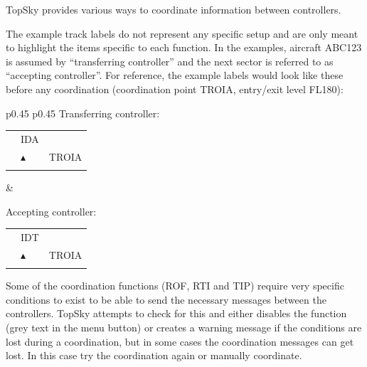 \documentclass[a4paper,oneside,11pt]{memoir}
\begin{document}
TopSky provides various ways to coordinate information between controllers.

\bigskip

The example track labels do not represent any specific setup and are only meant to highlight the items specific to each function. In the examples, aircraft ABC123 is assumed by “transferring controller” and the next sector is referred to as “accepting controller”. For reference, the example labels would look like these before any coordination (coordination point TROIA, entry/exit level FL180):

\bigskip

\begin{longtable}{p{} p{}}
  Transferring controller:

  \begin{tabular}{
    >{\columncolor{Flight Highlight}}l 
    >{\columncolor{Flight Highlight}}l
    >{\columncolor{Flight Highlight}}l }
    {\color{Assumed} ABC123} & {\color{Coordination} IDA}       & {\color{Assumed} }      \\
    {\color{Assumed} 100}    & {\color{Assumed} $\blacktriangle$} & {\color{Assumed} TROIA} \\
    {\color{Assumed} 180}    & {\color{Assumed} }          & {\color{Assumed} }     
  \end{tabular}
  &

  Accepting controller:

  \begin{tabular}{
    >{\columncolor{Flight Highlight}}l 
    >{\columncolor{Flight Highlight}}l
    >{\columncolor{Flight Highlight}}l }
    {\color{Coordination} ABC123} & {\color{Coordination} IDT}       & {\color{Coordination} }      \\
    {\color{Coordination} 100}    & {\color{Coordination} $\blacktriangle$} & {\color{Coordination} TROIA} \\
    {\color{Coordination} 180}    & {\color{Coordination} }          & {\color{Coordination} }     
  \end{tabular}
  \end{longtable}

\bigskip

Some of the coordination functions (ROF, RTI and TIP) require very specific conditions to exist to be able to send the necessary messages between the controllers. TopSky attempts to check for this and either disables the function (grey text in the menu button) or creates a warning message if the conditions are lost during a coordination, but in some cases the coordination messages can get lost. In this case try the coordination again or manually coordinate.
\end{document}
